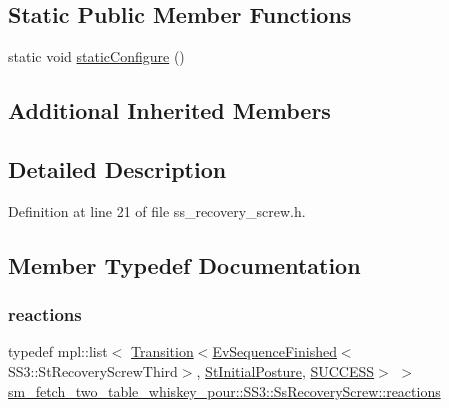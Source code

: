\subsection*{Static Public Member Functions}
\begin{DoxyCompactItemize}
\item 
static void \hyperlink{structsm__fetch__two__table__whiskey__pour_1_1SS3_1_1SsRecoveryScrew_a6bfc035c0ca394ff32d4e243a5bbb5c8}{static\+Configure} ()
\end{DoxyCompactItemize}
\subsection*{Additional Inherited Members}


\subsection{Detailed Description}


Definition at line 21 of file ss\+\_\+recovery\+\_\+screw.\+h.



\subsection{Member Typedef Documentation}
\mbox{\label{structsm__fetch__two__table__whiskey__pour_1_1SS3_1_1SsRecoveryScrew_af4bfbbfce8ff5c008c9c5494feedea30}} 
\subsubsection{\texorpdfstring{reactions}{reactions}}
{\footnotesize\ttfamily typedef mpl\+::list$<$ \hyperlink{classsmacc_1_1Transition}{Transition}$<$\hyperlink{structsmacc_1_1default__events_1_1EvSequenceFinished}{Ev\+Sequence\+Finished}$<$S\+S3\+::\+St\+Recovery\+Screw\+Third$>$, \hyperlink{structsm__fetch__two__table__whiskey__pour_1_1StInitialPosture}{St\+Initial\+Posture}, \hyperlink{structsmacc_1_1default__transition__tags_1_1SUCCESS}{S\+U\+C\+C\+E\+SS}$>$ $>$ \hyperlink{structsm__fetch__two__table__whiskey__pour_1_1SS3_1_1SsRecoveryScrew_af4bfbbfce8ff5c008c9c5494feedea30}{sm\+\_\+fetch\+\_\+two\+\_\+table\+\_\+whiskey\+\_\+pour\+::\+S\+S3\+::\+Ss\+Recovery\+Screw\+::reactions}}



